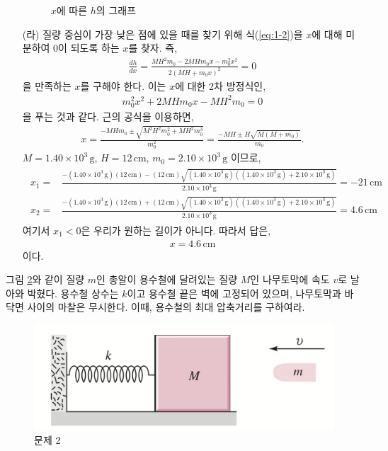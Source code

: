 \documentclass[floatfix,nofootinbib,superscriptaddress,fleqn]{revtex4-2}
\begin{document}
\begin{itemize}
\begin{figure}[htbp]
    \caption{$x$에 따른 $h$의 그래프}
    \label{<label>}
  \end{figure}
  \item[(라)] 질량 중심이 가장 낮은 점에 있을 때를 찾기 위해 식(\ref{eq:1-2})을 
  $x$에 대해 미분하여 0이 되도록 하는 $x$를 찾자. 즉,
  \begin{align}
    \frac{dh}{dx} = \frac{MH^2m_0-2MHm_0x-m_0^2x^2}{2(MH+m_0x)^2} = 0
  \end{align}
  을 만족하는 $x$를 구해야 한다. 이는 $x$에 대한 2차 방정식인,
  \begin{align}
    m_0^2x^2 +2MHm_0x -MH^2m_0 = 0 
  \end{align}
  을 푸는 것과 같다. 근의 공식을 이용하면,
  \begin{align}
    x = \frac{-MHm_0\pm\sqrt{M^2H^2m_0^2+MH^2m_0^3}}{m_0^2}
    = \frac{-MH\pm H\sqrt{M(M+m_0)}}{m_0}.
  \end{align}
  $M=1.40\times 10^{3}\,\mathrm{g}$, $H=12\,\mathrm{cm}$,
  $m_0=2.10\times 10^3\,\mathrm{g}$ 이므로,
  \begin{align}
    \begin{split}
      x_1 =& \frac{-(1.40\times 10^{3}\,\mathrm{g})(12\,\mathrm{cm}) 
      - (12\,\mathrm{cm})\sqrt{(1.40\times 10^{3}\,\mathrm{g})
      ((1.40\times 10^{3}\,\mathrm{g})
      +2.10\times 10^3\,\mathrm{g})}}{2.10\times 10^3\,\mathrm{g}}
      =-21\,\mathrm{cm}  \\
      x_2 =& \frac{-(1.40\times 10^{3}\,\mathrm{g})(12\,\mathrm{cm}) 
      + (12\,\mathrm{cm})\sqrt{(1.40\times 10^{3}\,\mathrm{g})
      ((1.40\times 10^{3}\,\mathrm{g})
      +2.10\times 10^3\,\mathrm{g})}}{2.10\times 10^3\,\mathrm{g}}
      =4.6\,\mathrm{cm}
    \end{split}
  \end{align}
  여기서 $x_1<0$은 우리가 원하는 길이가 아니다. 따라서 답은,
  \begin{align}
    x = 4.6\,\mathrm{cm}
  \end{align}
  이다.
\end{itemize}
\vspace{1cm}
그림 \ref{fig:2}와 같이 질량 $m$인 총알이 용수철에 달려있는 질량 $M$인
나무토막에 속도 $v$로 날아와 박혔다. 용수철 상수는 $k$이고 용수철 끝은
벽에 고정되어 있으며, 나무토막과 바닥면 사이의 마찰은 무시한다. 이때,
용수철의 최대 압축거리를 구하여라. 
\begin{figure}[ht]
  \centering
\includegraphics[scale=0.4]{Qfig11-2-20220406.png}
  \caption{문제 2}
  \label{fig:2}
\end{figure}
\end{document}
